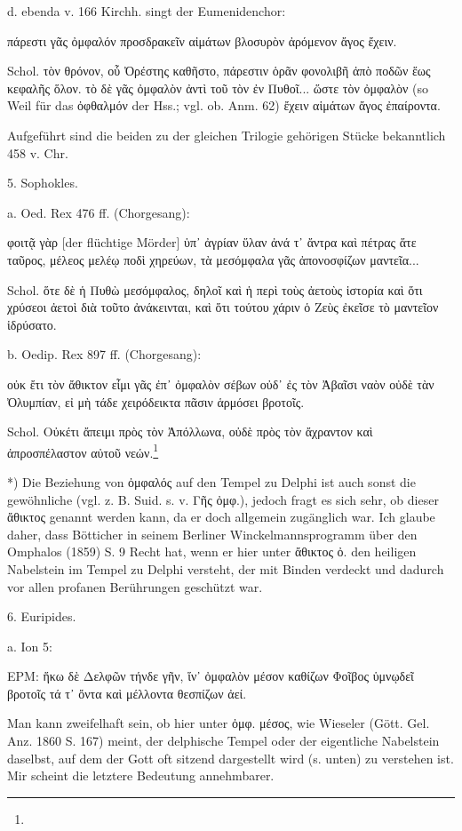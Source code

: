 \documentclass[a4paper, 11pt, oneside]{article}
\begin{document}
d. ebenda v. 166 Kirchh. singt der Eumenidenchor:

πάρεστι γᾶς ὀμφαλόν  
προσδρακεῖν αἰμάτων  
βλοσυρὸν ἀρόμενον ἄγος ἔχειν.

Schol. τὸν θρόνον, οὗ Ὀρέστης καθῆστο, πάρεστιν ὁρᾶν φονολιβῆ ἀπὸ ποδῶν ἕως κεφαλῆς ὅλον. τὸ δὲ γᾶς ὀμφαλὸν ἀντὶ τοῦ τὸν ἐν Πυθοῖ... ὥστε τὸν ὀμφαλὸν (so Weil für das ὀφθαλμόν der Hss.; vgl. ob. Anm. 62) ἔχειν αἱμάτων ἄγος ἐπαίροντα.

Aufgeführt sind die beiden zu der gleichen Trilogie gehörigen Stücke bekanntlich 458 v. Chr.

5. Sophokles.

a. Oed. Rex 476 ff. (Chorgesang):

φοιτᾷ γὰρ [der flüchtige Mörder] ὑπ᾽ ἀγρίαν  
ὕλαν ἀνά τ᾽ ἄντρα καὶ  
πέτρας ἅτε ταῦρος,  
μέλεος μελέῳ ποδὶ χηρεύων,  
τὰ μεσόμφαλα γᾶς ἀπονοσφίζων  
μαντεῖα...

Schol. ὅτε δὲ ἡ Πυθὼ μεσόμφαλος, δηλοῖ καὶ ἡ περὶ τοὺς ἀετοὺς ἱστορία καὶ ὅτι χρύσεοι ἀετοὶ διὰ τοῦτο ἀνάκεινται, καὶ ὅτι τούτου χάριν ὁ Ζεὺς ἐκεῖσε τὸ μαντεῖον ἱδρύσατο.

b. Oedip. Rex 897 ff. (Chorgesang):

οὐκ ἔτι τὸν ἄθικτον εἶμι γᾶς ἐπ᾿ ὀμφαλὸν σέβων  
οὐδ᾽ ἐς τὸν Ἀβαῖσι ναὸν  
οὐδὲ τὰν Ὀλυμπίαν,  
εἰ μὴ τάδε χειρόδεικτα  
πᾶσιν ἁρμόσει βροτοῖς.

Schol. Οὐκέτι ἄπειμι πρὸς τὸν Ἀπόλλωνα, οὐδὲ πρὸς τὸν ἄχραντον καὶ ἀπροσπέλαστον αὐτοῦ νεών.\footnote{}

*) Die Beziehung von ὀμφαλός auf den Tempel zu Delphi ist auch sonst die gewöhnliche (vgl. z. B. Suid. s. v. Γῆς ὀμφ.), jedoch fragt es sich sehr, ob dieser ἄθικτος genannt werden kann, da er doch allgemein zugänglich war. Ich glaube daher, dass Bötticher in seinem Berliner Winckelmannsprogramm über den Omphalos (1859) S. 9 Recht hat, wenn er hier unter ἄθικτος ὀ. den heiligen Nabelstein im Tempel zu Delphi versteht, der mit Binden verdeckt und dadurch vor allen profanen Berührungen geschützt war.

6. Euripides.

a. Ion 5:

ΕΡΜ:  
ἥκω δὲ Δελφῶν τήνδε γῆν, ἵν᾽ ὀμφαλὸν  
μέσον καθίζων Φοῖβος ὑμνῳδεῖ βροτοῖς  
τά τ᾽ ὄντα καὶ μέλλοντα θεσπίζων ἀεί.

Man kann zweifelhaft sein, ob hier unter ὀμφ. μέσος, wie Wieseler (Gött. Gel. Anz. 1860 S. 167) meint, der delphische Tempel oder der eigentliche Nabelstein daselbst, auf dem der Gott oft sitzend dargestellt wird (s. unten) zu verstehen ist. Mir scheint die letztere Bedeutung annehmbarer.
\end{document}
